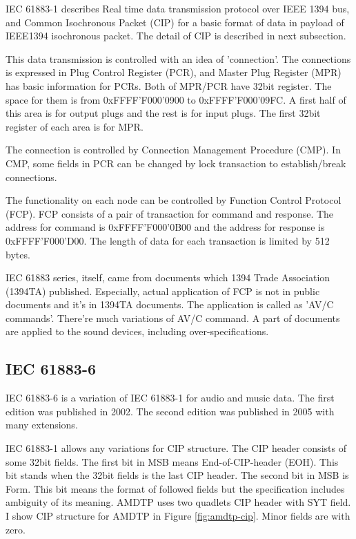 \documentclass[onecolumn]{article}
\begin{document}
IEC 61883-1 describes Real time data transmission protocol over IEEE 1394 bus, and Common Isochronous Packet (CIP) for a basic format of data in payload of IEEE1394 isochronous packet. The detail of CIP is described in next subsection.

This data transmission is controlled with an idea of 'connection'. The connections is expressed in Plug Control Register (PCR), and Master Plug Register (MPR) has basic information for PCRs. Both of MPR/PCR have 32bit register. The space for them is from 0xFFFF'F000'0900 to 0xFFFF'F000'09FC. A first half of this area is for output plugs and the rest is for input plugs. The first 32bit register of each area is for MPR.

The connection is controlled by Connection Management Procedure (CMP). In CMP, some fields in PCR can be changed by lock transaction to establish/break connections.

The functionality on each node can be controlled by Function Control Protocol (FCP). FCP consists of a pair of transaction for command and response. The address for command is 0xFFFF'F000'0B00 and the address for response is 0xFFFF'F000'D00. The length of data for each transaction is limited by 512 bytes.

IEC 61883 series, itself, came from documents which 1394 Trade Association (1394TA) published. Especially, actual application of FCP is not in public documents and it's in 1394TA documents. The application is called as 'AV/C commands'. There're much variations of AV/C command. A part of documents are applied to the sound devices, including over-specifications\cite{avc-general-4-2, avc-audio-1, avc-music-1, avc-descriptor-1, avc-info-block-1, avc-stream-format-1, avc-stream-format-1-1, avc-rate-control}.


\subsection{IEC 61883-6}

IEC 61883-6 is a variation of IEC 61883-1 for audio and music data. The first edition was published in 2002\cite{iec61883-6-1}. The second edition was published in 2005 with many extensions\cite{iec61883-6-2}.

IEC 61883-1\cite{iec61883-1-1, iec61883-1-2, iec61883-1-3} allows any variations for CIP structure. The CIP header consists of some 32bit fields. The first bit in MSB means End-of-CIP-header (EOH). This bit stands when the 32bit fields is the last CIP header. The second bit in MSB is Form. This bit means the format of followed fields but the specification includes ambiguity of its meaning. AMDTP uses two quadlets CIP header with SYT field. I show CIP structure for AMDTP in Figure \ref{fig:amdtp-cip}. Minor fields are with zero.
\end{document}
